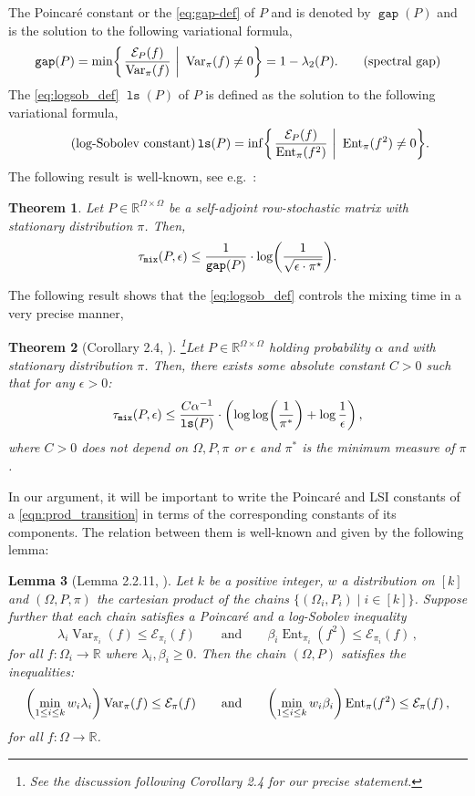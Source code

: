 \documentclass[a4paper, 12p]{article}
\numberwithin{equation}{section}
\newcommand{\var}{\operatorname{Var}}
\newcommand{\dir}{\mathcal{E}}
\newcommand{\ent}{\operatorname{Ent}}
\newcommand{\Om}{\Omega}
\newtheorem{theorem}{Theorem}[section]
\newtheorem{lemma}[theorem]{Lemma}
\DeclarePairedDelimiter\set{\lbrace}{\rbrace}
\DeclarePairedDelimiter\parens{\lparen}{\rparen}
\def\Tmix{\tau_{\mathtt{mix}}}
\DeclareMathOperator{\Gap}{\mathtt{gap}}
\DeclareMathOperator{\LS}{\mathtt{ls}}
\begin{document}
The Poincar\'e constant or the \ref{eq:gap-def} of $P$ and
is denoted by $\Gap(P)$ and is the solution to the following variational formula,
\begin{equation}\label{eq:gap-def}
	\Gap(P) = \min\set*{ \left. \frac{ \dir_P(f)
	}{\var_\pi(f) } ~\right|~ \var_\pi(f) \ne 0} = 1 -
	\lambda_2(P).\tag{spectral gap}
\end{equation}
The \ref{eq:logsob_def} $\LS(P)$ of $P$ is defined as the solution to the following variational formula,
\begin{equation}\label{eq:logsob_def}\tag{log-Sobolev constant}
    \LS(P) = \inf\set*{\left. \frac{\dir_P(f)}{\ent_\pi(f^2)}~\right|~\ent_\pi(f^2) \ne 0}.
\end{equation}
The following result is well-known, see e.g.~\cite{diacstroock}:
\begin{theorem}\label{thm:spec-mix}
    Let $P \in \mathbb R^{\Omega \times \Omega}$ be a self-adjoint row-stochastic matrix with stationary distribution $\pi$. Then,
    \[ \Tmix(P, \epsilon) \le \frac{1}{\Gap(P)} \cdot \log\parens*{\frac{1}{\sqrt{\epsilon \cdot \pi^\star}}}.\]
\end{theorem}
The following result shows that the \ref{eq:logsob_def} controls the mixing time in a very precise manner, 
\begin{theorem}[Corollary 2.4, \cite{montenegro2006mathematical}]\footnote{See the discussion following Corollary 2.4 for our precise statement.}\label{thm:lsi_mix}
    Let $P \in \mathbb R^{\Omega \times \Omega}$ holding probability $\alpha$ and with stationary distribution $\pi$. Then, there exists some absolute constant $C > 0$ such that for any $\epsilon > 0$:
    \[ \Tmix(P, \epsilon) \le \frac{C \alpha^{-1}}{\LS(P)} \cdot \parens*{\log \log \parens*{  \frac{1}{\pi^*}} + \log \frac{1}{\epsilon}}\,,\]
    where $C> 0$ does not depend on $\Omega, P, \pi$ or $\epsilon$ and $\pi^*$ is the minimum measure of $\pi$.
\end{theorem}
In our argument, it will be important to write the Poincar\'e and LSI constants of a \ref{eqn:prod_transition} in terms of the corresponding constants of its components. The relation between them is well-known and given by the following lemma: 
\begin{lemma}[Lemma 2.2.11, \cite{SC97}]\label{lem:product_ineq}
    Let $k$ be a positive integer, $w$ a distribution on $[k]$ and $(\Omega, P, \pi)$ the cartesian product of the chains $\{(\Omega_i, P_i) \mid i \in [k]\}$. Suppose further that each chain satisfies a Poincar\'e and a log-Sobolev inequality 
    \[
        \lambda_i \var_{\pi_i}( f ) \leq \dir_{\pi_i} (f) \qquad \text{and} \qquad \beta_i \ent_{\pi_i} (f^2) \leq \dir_{\pi_i}(f)\,,
    \]
    for all $f:\Om_i\to \mathbb{R}$ where $\lambda_i, \beta_i \ge 0$. Then the chain $(\Omega, P)$ satisfies the inequalities:
    \[
        \parens*{\min_{1\leq i\leq k} w_i\lambda_i} \var_{\pi}( f )\leq \dir_{\pi}(f) \qquad \text{and} \qquad \parens*{\min_{1\leq i\leq k} w_i\beta_i} \ent_{\pi} (f^2) \leq \dir_{\pi}(f)\,,
    \]
    for all $f:\Om\to\mathbb{R}$.
\end{lemma}
\end{document}
